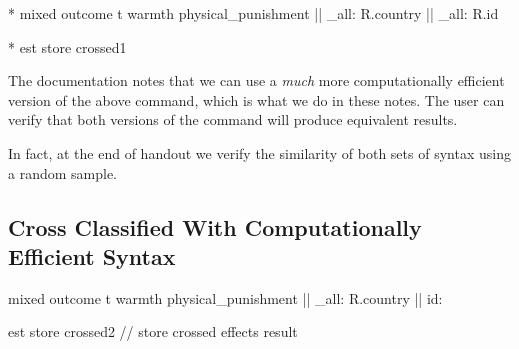 \documentclass[
  letterpaper,
  DIV=11,
  numbers=noendperiod]{scrreprt}
\newenvironment{Shaded}{\begin{snugshade}}{\end{snugshade}}
\newcommand{\CommentTok}[1]{\textcolor[rgb]{0.37,0.37,0.37}{#1}}
\newcommand{\DataTypeTok}[1]{\textcolor[rgb]{0.68,0.00,0.00}{#1}}
\newcommand{\KeywordTok}[1]{\textcolor[rgb]{0.00,0.23,0.31}{#1}}
\newcommand{\NormalTok}[1]{\textcolor[rgb]{0.00,0.23,0.31}{#1}}
\begin{document}
\begin{Shaded}
\begin{Highlighting}[]
    
\NormalTok{* mixed outcome t warmth physical\_punishment || }\DataTypeTok{\_all}\NormalTok{: R.country || }\DataTypeTok{\_all}\NormalTok{: R.id}
    
\NormalTok{* }\KeywordTok{est} \KeywordTok{store}\NormalTok{ crossed1}
\end{Highlighting}
\end{Shaded}

The documentation notes that we can use a \emph{much} more
computationally efficient version of the above command, which is what we
do in these notes. The user can verify that both versions of the command
will produce equivalent results.

In fact, at the end of handout we verify the similarity of both sets of
syntax using a random sample.

\subsection{Cross Classified With Computationally Efficient
Syntax}\label{cross-classified-with-computationally-efficient-syntax}

\begin{Shaded}
\begin{Highlighting}[]

\NormalTok{mixed outcome t warmth physical\_punishment || }\DataTypeTok{\_all}\NormalTok{: R.country || id:}
    
\KeywordTok{est} \KeywordTok{store}\NormalTok{ crossed2 }\CommentTok{// store crossed effects result}
\end{Highlighting}
\end{Shaded}
\end{document}
